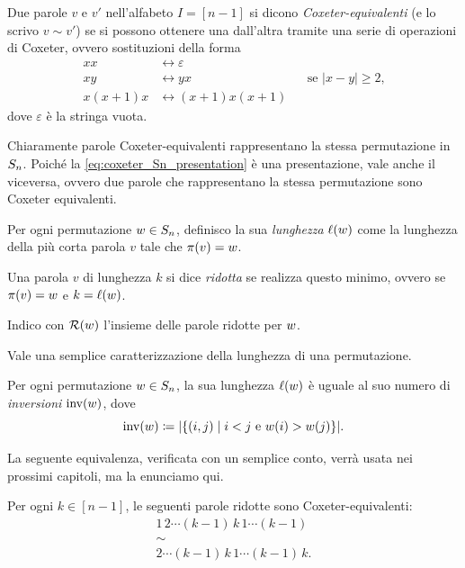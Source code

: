 \begin{definition}
    Due parole $v$ e $v'$ nell'alfabeto $I = [n-1]$ si dicono \emph{Coxeter-equivalenti}
    (e lo scrivo $v \sim v'$) se
    si possono ottenere una dall'altra tramite una serie di operazioni
    di Coxeter, ovvero sostituzioni della forma
    \begin{align*}
        xx &\leftrightarrow \varepsilon \\ 
        xy &\leftrightarrow yx && \text{se $\lvert x - y \rvert \geq 2$,} \\
        x (x+1) x &\leftrightarrow (x+1) x (x+1) 
    \end{align*}
    dove $\varepsilon$ \`e la stringa vuota.
\end{definition}

Chiaramente parole Coxeter-equivalenti rappresentano la stessa permutazione 
in $S_n$.
Poich\'e la \eqref{eq:coxeter_Sn_presentation} \`e una presentazione, vale anche il
viceversa, ovvero due parole che rappresentano la stessa permutazione
sono Coxeter equivalenti.

\begin{definition}
    \label{def:red_word}
    Per ogni permutazione $w \in S_n$, definisco la sua \emph{lunghezza}
    $\operatorname{\ell}(w)$ come la lunghezza della pi\`u corta parola $v$ tale che $\operatorname{\pi}(v) = w$.

    Una parola $v$ di lunghezza $k$ si dice \emph{ridotta} 
    se realizza questo minimo, ovvero se $\operatorname{\pi}(v) = w$ e $k = \operatorname{\ell}(w)$.

    Indico con $\operatorname{\mathcal{R}}(w)$ l'insieme delle parole ridotte per $w$.
\end{definition}


Vale una semplice caratterizzazione della lunghezza di una permutazione.

\begin{proposition}
    Per ogni permutazione $w \in S_n$, la sua lunghezza $\operatorname{\ell}(w)$
    \`e uguale al suo numero di \emph{inversioni} $\operatorname{inv}(w)$, dove
    \[
        \operatorname{inv}(w) \coloneq \lvert \{
            (i, j) \mid i<j \text{ e } w(i) > w(j)
        \} \rvert.
    \]
\end{proposition}


La seguente equivalenza, verificata con un semplice conto, verr\`a usata nei prossimi
capitoli, ma la enunciamo qui.

\begin{lemma}
    \label{lem:parole_equiv}
    Per ogni $k \in [n-1]$, le seguenti parole ridotte sono Coxeter-equivalenti:
    \begin{gather*}
        1 \, 2  \cdots (k-1) \, k \, 1 \cdots (k-1) \\
        \sim \\
        2 \cdots (k-1) \, k \, 1 \cdots (k-1) \, k.
    \end{gather*}

\end{lemma}


